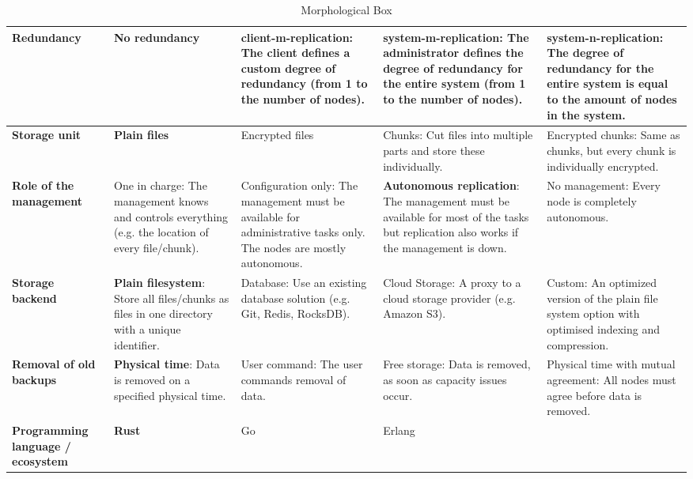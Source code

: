 \begin{table}
	\centering
	\caption[Morphological Box]{Morphological Box}
	\label{tbl:morphological-box}
    \begin{tabu}{X | X X X X}
		\hline
          \textbf{Redundancy}
          & No redundancy
          & \Gls{client-m-replication}: The \gls{client} defines a custom degree of redundancy (from 1 to the number of \glspl{node}).
          & \Gls{system-m-replication}: The administrator defines the degree of redundancy for the entire system (from 1 to the number of \glspl{node}).
          & \textbf{\Gls{system-n-replication}}: The degree of redundancy for the entire system is equal to the amount of \glspl{node} in the system.
          \\ \hline

          \textbf{Storage unit}
          & \textbf{Plain files}
          & Encrypted files
          & Chunks: Cut files into multiple parts and store these individually.
          & Encrypted chunks: Same as chunks, but every chunk is individually encrypted.
          \\ \hline


          \textbf{Role of the management}
          & One in charge: The management knows and controls everything (e.g. the location of every file/chunk).
          & Configuration only: The management must be available for administrative tasks only. The \glspl{node} are mostly autonomous.
          & \textbf{Autonomous replication}: The management must be available for most of the tasks but replication also works if the management is down.
          & No management: Every \gls{node} is completely autonomous.
          \\ \hline


          \textbf{Storage backend}
          & \textbf{Plain filesystem}: Store all files/chunks as files in one directory with a unique identifier.
          & Database: Use an existing database solution (e.g. Git, Redis, RocksDB).
          & Cloud Storage: A proxy to a cloud storage provider (e.g. Amazon S3).
          & Custom: An optimized version of the plain file system option with optimised indexing and compression.
          \\ \hline


          \textbf{Removal of old backups}
          & \textbf{Physical time}: Data is removed on a specified physical time.
          & User command: The user commands removal of data.
          & Free storage: Data is removed, as soon as capacity issues occur.
          & Physical time with mutual agreement: All \glspl{node} must agree before data is removed.
          \\ \hline


          \textbf{Programming language / ecosystem}
          & \textbf{Rust}
          & Go
          & Erlang
          & 
          \\ \hline
	\end{tabu}
\end{table}

